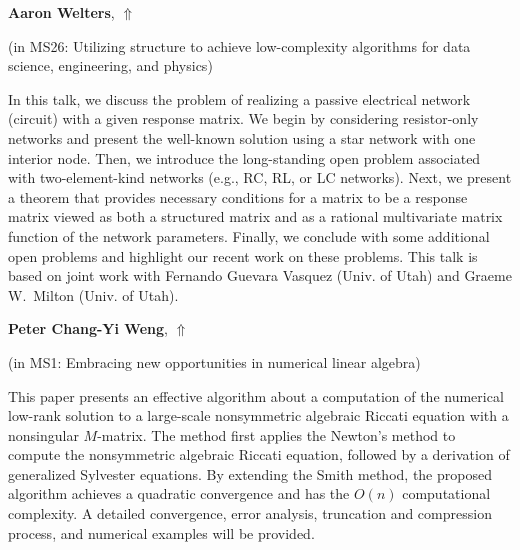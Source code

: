 \documentclass[ILAS2025-program.tex]{subfiles}
\begin{document}
\hypertarget{down0058}{}\begin{ilasabstract}
    
\textbf{Aaron Welters},  \hfill \hyperlink{up0058}{$\Uparrow$}
    
    
(in {\color{mstitle}MS26: Utilizing structure to achieve low-complexity algorithms for data science, engineering, and physics})
        
\mtskip
    In this talk, we discuss the problem of realizing a passive electrical network (circuit) with a given response matrix. We begin by considering resistor-only networks and present the well-known solution using a star network with one interior node. Then, we introduce the long-standing open problem associated with two-element-kind networks (e.g., RC, RL, or LC networks). Next, we present a theorem that provides necessary conditions for a matrix to be a response matrix viewed as both a structured matrix and as a rational multivariate matrix function of the network parameters. Finally, we conclude with some additional open problems and highlight our recent work on these problems. This talk is based on joint work with Fernando Guevara Vasquez (Univ. of Utah) and Graeme W.\ Milton (Univ. of Utah).  

\end{ilasabstract}
    

\hypertarget{down0273}{}\begin{ilasabstract}
    
\textbf{Peter Chang-Yi Weng},  \hfill \hyperlink{up0273}{$\Uparrow$}
    
    
(in {\color{mstitle}MS1: Embracing new opportunities in numerical linear algebra})
        
\mtskip
    This paper presents an effective algorithm about a computation of the numerical
low-rank solution to a large-scale nonsymmetric algebraic Riccati equation with
a nonsingular $M$-matrix. The method first applies the Newton’s method to compute the nonsymmetric algebraic Riccati equation, followed by a derivation of
generalized Sylvester equations. By extending the Smith method, the proposed
algorithm achieves a quadratic convergence and has the $O(n)$ computational
complexity. A detailed convergence, error analysis, truncation and compression
process, and numerical examples will be provided.
\end{ilasabstract}
    
\end{document}
